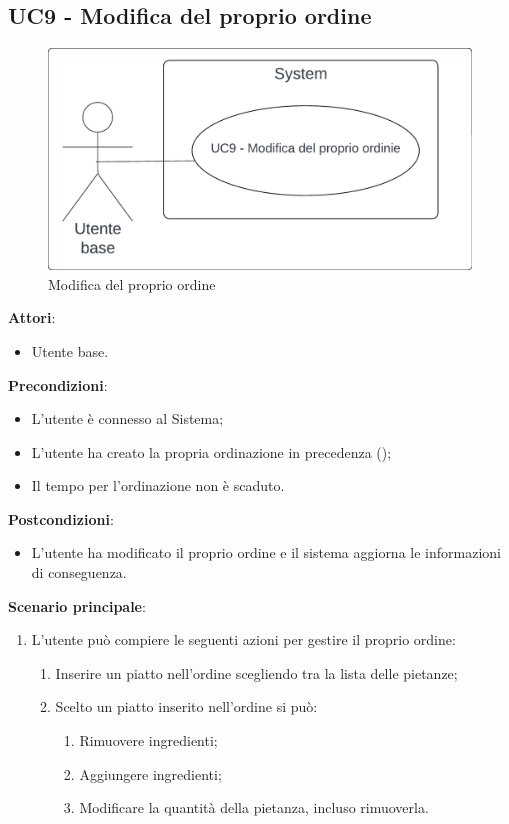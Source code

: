 \subsection{UC9 - Modifica del proprio ordine}\label{usecase:9}
\begin{figure}[H]
    \centering
    \includegraphics[width=0.7\linewidth]{ucd/ucd9.png}
\caption{Modifica del proprio ordine}
\end{figure}
\textbf{Attori}:
\begin{itemize}
    \item Utente base.
\end{itemize}
\textbf{Precondizioni}:
\begin{itemize}
    \item L'utente è connesso al Sistema;
    \item L'utente ha creato la propria ordinazione in precedenza ();
    \item Il tempo per l'ordinazione non è scaduto.
\end{itemize}
\textbf{Postcondizioni}:
\begin{itemize}
    \item L'utente ha modificato il proprio ordine e il sistema aggiorna le informazioni di conseguenza.
\end{itemize}
\textbf{Scenario principale}:
\begin{enumerate}
    \item L'utente può compiere le seguenti azioni per gestire il proprio ordine:
    \begin{enumerate}
        \item Inserire un piatto nell'ordine scegliendo tra la lista delle pietanze;
        \item Scelto un piatto inserito nell'ordine si può:
        \begin{enumerate}
            \item Rimuovere ingredienti;
            \item Aggiungere ingredienti;
            \item Modificare la quantità della pietanza, incluso rimuoverla.
        \end{enumerate}
    \end{enumerate}
\end{enumerate}

\newpage